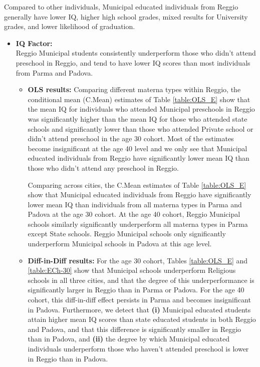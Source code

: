 \documentclass[11pt]{article}
\begin{document}
Compared to other individuals, Municipal educated individuals from Reggio generally have lower IQ, higher high school grades, mixed results for University grades, and lower likelihood of graduation.
\begin{itemize}
\item \textbf{IQ Factor:} \\
Reggio Municipal students consistently underperform those who didn't attend preschool in Reggio, and tend to have lower IQ scores than most individuals from Parma and Padova.
	\begin{itemize}
	\item \textbf{OLS results:} Comparing different materna types within Reggio, the conditional mean (C.Mean) estimates of Table \ref{table:OLS_E} show that the mean IQ for individuals who attended Municipal preschools in Reggio was significantly higher than the mean IQ for those who attended state schools and significantly lower than those who attended Private school or didn't attend preschool in the age 30 cohort. Most of the estimates become insignificant at the age 40 level and we only see that Municipal educated individuals from Reggio have significantly lower mean IQ than those who didn't attend any preschool in Reggio.
	
	Comparing across cities, the C.Mean estimates of Table \ref{table:OLS_E} show that Municipal educated individuals from Reggio have significantly lower mean IQ than individuals from all materna types in Parma and Padova at the age 30 cohort. At the age 40 cohort, Reggio Municipal schools similarly significantly underperform all materna types in Parma except State schools. Reggio Municipal schools only significantly underperform Municipal schools in Padova at this age level.

	\item \textbf{Diff-in-Diff results:} For the age 30 cohort, Tables  \ref{table:OLS_E} and \ref{table:ECh-30} show that Municipal schools underperform Religious schools in all three cities, and that the degree of this underperformance is significantly larger in Reggio than in Parma or Padova. For the age 40 cohort, this diff-in-diff effect persists in Parma and becomes insignificant in Padova. Furthermore, we detect that \textbf{(i)} Municipal educated students attain higher mean IQ scores than state educated students in both Reggio and Padova, and that this difference is significantly smaller in Reggio than in Padova, and \textbf{(ii)} the degree by which Municipal educated individuals underperform those who haven't attended preschool is lower in Reggio than in Padova.


\end{itemize}
\end{itemize}
\end{document}
